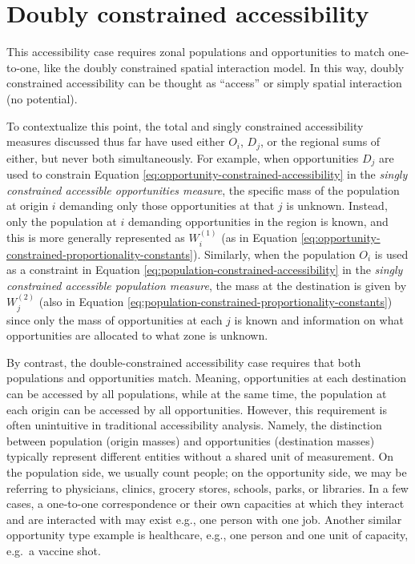 \documentclass[
11pt, %
oneside, %
english, %
singlespacing, %
]{macthesis} %
\begin{document}
\section{Doubly constrained accessibility}\label{doubly-constrained-accessibility}

This accessibility case requires zonal populations and opportunities to match one-to-one, like the doubly constrained spatial interaction model. In this way, doubly constrained accessibility can be thought as ``access'' or simply spatial interaction (no potential).

To contextualize this point, the total and singly constrained accessibility measures discussed thus far have used either \(O_i\), \(D_j\), or the regional sums of either, but never both simultaneously. For example, when opportunities \(D_j\) are used to constrain Equation \ref{eq:opportunity-constrained-accessibility} in the \emph{singly constrained accessible opportunities measure}, the specific mass of the population at origin \(i\) demanding only those opportunities at that \(j\) is unknown. Instead, only the population at \(i\) demanding opportunities in the region is known, and this is more generally represented as \(W_i^{(1)}\) (as in Equation \ref{eq:opportunity-constrained-proportionality-constants}). Similarly, when the population \(O_i\) is used as a constraint in Equation \ref{eq:population-constrained-accessibility} in the \emph{singly constrained accessible population measure}, the mass at the destination is given by \(W_j^{(2)}\) (also in Equation \ref{eq:population-constrained-proportionality-constants}) since only the mass of opportunities at each \(j\) is known and information on what opportunities are allocated to what zone is unknown.

By contrast, the double-constrained accessibility case requires that both populations and opportunities match. Meaning, opportunities at each destination can be accessed by all populations, while at the same time, the population at each origin can be accessed by all opportunities. However, this requirement is often unintuitive in traditional accessibility analysis. Namely, the distinction between population (origin masses) and opportunities (destination masses) typically represent different entities without a shared unit of measurement. On the population side, we usually count people; on the opportunity side, we may be referring to physicians, clinics, grocery stores, schools, parks, or libraries. In a few cases, a one-to-one correspondence or their own capacities at which they interact and are interacted with may exist e.g., one person with one job. Another similar opportunity type example is healthcare, e.g., one person and one unit of capacity, e.g.~a vaccine shot.
\end{document}
